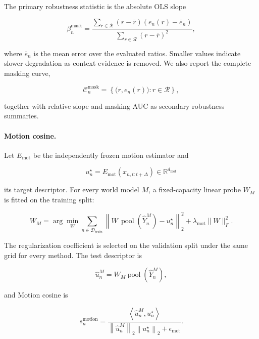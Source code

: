 The primary robustness statistic is the absolute OLS slope

\begin{equation*}
\beta_n^{\mathrm{mask}}
=
\frac{
\sum_{r\in\mathcal R}
(r-\bar r)
\left(
e_n(r)-\bar e_n
\right)
}{
\sum_{r\in\mathcal R}
(r-\bar r)^2
},
\end{equation*}

where \(\bar e_n\) is the mean error over the evaluated ratios. Smaller
values indicate slower degradation as context evidence is removed. We
also report the complete masking curve,

\begin{equation*}
\mathcal C_n^{\mathrm{mask}}
=
\left\{
\bigl(r,e_n(r)\bigr):
r\in\mathcal R
\right\},
\end{equation*}

together with relative slope and masking AUC as secondary robustness
summaries.

\paragraph{Motion cosine.}
Let \(E_{\mathrm{mot}}\) be the independently frozen motion estimator
and

\begin{equation*}
u_n^\star
=
E_{\mathrm{mot}}
\left(
x_{n,t:t+\Delta}
\right)
\in\mathbb R^{d_{\mathrm{mot}}}
\end{equation*}

its target descriptor. For every world model \(M\), a fixed-capacity
linear probe \(W_M\) is fitted on the training split:

\begin{equation*}
W_M
=
\arg\min_W
\sum_{n\in\mathcal D_{\mathrm{train}}}
\left\|
W\,\operatorname{pool}
\left(
\widehat Y_n^{M}
\right)
-
u_n^\star
\right\|_2^2
+
\lambda_{\mathrm{mot}}\|W\|_F^2 .
\end{equation*}

The regularization coefficient is selected on the validation split
under the same grid for every method. The test descriptor is

\begin{equation*}
\widehat u_n^M
=
W_M
\operatorname{pool}
\left(
\widehat Y_n^M
\right),
\end{equation*}

and Motion cosine is

\begin{equation*}
s_n^{\mathrm{motion}}
=
\frac{
\left\langle
\widehat u_n^M,u_n^\star
\right\rangle
}{
\left\|\widehat u_n^M\right\|_2
\left\|u_n^\star\right\|_2
+
\epsilon_{\mathrm{mot}}
}.
\end{equation*}

